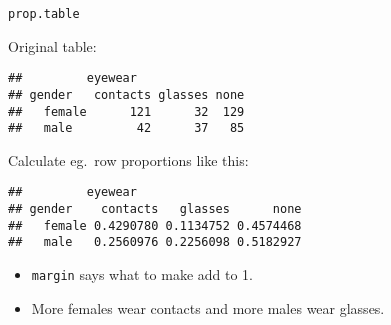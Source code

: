 \begin{frame}[fragile]{\texttt{prop.table}}
  
Original table:

{\footnotesize
\begin{knitrout}
\color{fgcolor}\begin{kframe}
\begin{alltt}
\end{alltt}
\begin{verbatim}
##         eyewear
## gender   contacts glasses none
##   female      121      32  129
##   male         42      37   85
\end{verbatim}
\end{kframe}
\end{knitrout}
}
    
Calculate eg.\ row proportions like this:

{\small
\begin{knitrout}
\color{fgcolor}\begin{kframe}
\begin{alltt}
\hlstd{=}\hlstd{)}
\end{alltt}
\begin{verbatim}
##         eyewear
## gender    contacts   glasses      none
##   female 0.4290780 0.1134752 0.4574468
##   male   0.2560976 0.2256098 0.5182927
\end{verbatim}
\end{kframe}
\end{knitrout}
}

\begin{itemize}
\item \texttt{margin} says what to make add to 1.
\item More females wear contacts and more males wear glasses.
\end{itemize}

\end{frame}

